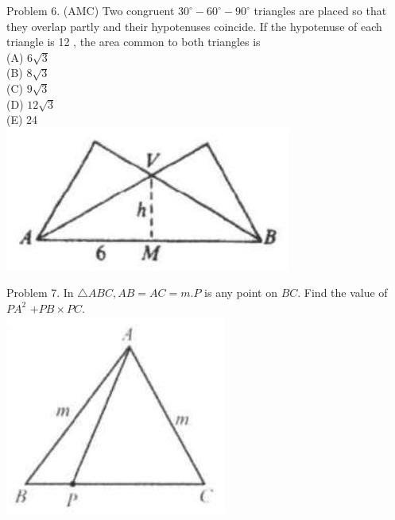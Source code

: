 \documentclass[10pt]{article}
\begin{document}
Problem 6. (AMC) Two congruent \(30^{\circ}-60^{\circ}-90^{\circ}\) triangles are placed so that they overlap partly and their hypotenuses coincide. If the hypotenuse of each triangle is 12 , the area common to both triangles is\\
(A) \(6 \sqrt{3}\)\\
(B) \(8 \sqrt{3}\)\\
(C) \(9 \sqrt{3}\)\\
(D) \(12 \sqrt{3}\)\\
(E) 24\\
\includegraphics[max width=\textwidth, center]{2025_04_17_97bc1f7e44d93c271a88g-089}

Problem 7. In \(\triangle A B C, A B=A C=m . P\) is any point on \(B C\). Find the value of \(P A^{2}\) \(+P B \times P C\).\\
\includegraphics[max width=\textwidth, center]{2025_04_17_97bc1f7e44d93c271a88g-089(3)}
\end{document}
